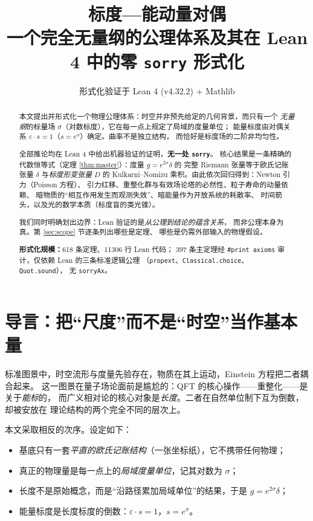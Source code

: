 \documentclass[11pt,a4paper]{article}
\title{\bfseries 标度—能动量对偶\\[4pt]
\large 一个完全无量纲的公理体系及其在 Lean 4 中的零 \texttt{sorry} 形式化}
\author{形式化验证于 Lean 4 (v4.32.2) + Mathlib}
\date{}
\theoremstyle{sudef}
\newcommand{\kron}{\delta}
\newcommand{\Defm}{D}
\begin{document}
\maketitle

\begin{abstract}
\noindent
本文提出并形式化一个物理公理体系：时空并非预先给定的几何背景，而只有一个
\emph{无量纲}的标量场 $\sigma$（对数标度），它在每一点上规定了局域的度量单位；
能量标度由对偶关系 $\varepsilon\cdot s=1$（$s=e^{\sigma}$）确定。曲率不是独立结构，
而恰好是标度场的二阶非均匀性。

全部推论均在 Lean 4 中给出机器验证的证明，\textbf{无一处 \texttt{sorry}}。
核心结果是一条精确的代数恒等式（定理 \ref{thm:master}）：度量 $g=e^{2\sigma}\kron$ 的
完整 Riemann 张量等于欧氏记账张量 $\kron$ 与\emph{标度形变张量} $\Defm$ 的
Kulkarni–Nomizu 乘积。由此依次回归得到：Newton 引力（Poisson 方程）、
引力红移、重整化群与有效场论塔的必然性、粒子寿命的动量依赖、
暗物质的“相互作用发生而观测失效”、暗能量作为开放系统的耗散率、
时间箭头，以及光的数学本质（标度盲的类光锥）。

我们同时明确划出边界：Lean 验证的是\emph{从公理到结论的蕴含关系}，
而非公理本身为真。第 \ref{sec:scope} 节逐条列出哪些是定理、
哪些是仍需外部输入的物理假设。

\medskip
\noindent\textbf{形式化规模：}618 条定理、11306 行 Lean 代码；
397 条主定理经 \texttt{\#print axioms} 审计，仅依赖 Lean 的三条标准逻辑公理
（\texttt{propext}、\texttt{Classical.choice}、\texttt{Quot.sound}），
无 \texttt{sorryAx}。
\end{abstract}

\tableofcontents

\section{导言：把“尺度”而不是“时空”当作基本量}

标准图景中，时空流形与度量先验存在，物质在其上运动，Einstein 方程把二者耦合起来。
这一图景在量子场论面前是尴尬的：QFT 的核心操作——重整化——是关于\emph{能标}的，
而广义相对论的核心对象是\emph{长度}。二者在自然单位制下互为倒数，却被安放在
理论结构的两个完全不同的层次上。

本文采取相反的次序。设定如下：

\begin{itemize}[leftmargin=1.6em]
\item 基底只有一套\emph{平直的欧氏记账结构}（一张坐标纸），它不携带任何物理；
\item 真正的物理量是每一点上的\emph{局域度量单位}，记其对数为 $\sigma$；
\item 长度不是原始概念，而是“沿路径累加局域单位”的结果，于是
      $g=e^{2\sigma}\kron$；
\item 能量标度是长度标度的倒数：$\varepsilon\cdot s=1$，$s=e^{\sigma}$。
\end{itemize}
\end{document}
